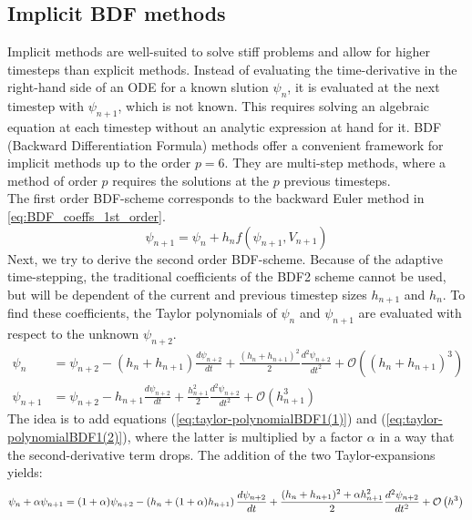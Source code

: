 \subsection{Implicit BDF methods}
Implicit methods are well-suited to solve stiff problems and allow for higher timesteps than explicit methods. Instead of evaluating the time-derivative in the right-hand side of an ODE for a known slution $\psi_n$, it is evaluated at the next timestep with $\psi_{n+1}$, which is not known. This requires solving an algebraic equation at each timestep without an analytic expression at hand for it. BDF (Backward Differentiation Formula) methods offer a convenient framework for implicit methods up to the order $p=6$. They are multi-step methods, where a method of order $p$ requires the solutions at the $p$ previous timesteps.  \\
The first order BDF-scheme corresponds to the backward Euler method in \autoref{eq:BDF_coeffs_1st_order}.
\begin{equation}
    \label{eq:BDF_coeffs_1st_order}
    \psi_{n+1} = \psi_n + h_{n}f(\psi_{n+1},V_{n+1})
\end{equation}
Next, we try to derive the second order BDF-scheme. Because of the adaptive time-stepping, the traditional coefficients of the BDF2 scheme cannot be used, but will be dependent of the current and previous timestep sizes $h_{n+1}$ and $h_n$. To find these coefficients, the Taylor polynomials of $\psi_n$ and $\psi_{n+1}$ are evaluated with respect to the unknown $\psi_{n+2}$. 
\begin{align}
    \label{eq:taylor-polynomialBDF1(1)}
    \psi_{n} &= \psi_{n+2} - (h_{n} + h_{n+1})\frac{d\psi_{n+2}}{dt} + \frac{(h_{n} + h_{n+1})^2}{2}\frac{d^2\psi_{n+2}}{dt^2} + \mathcal{O}\left((h_{n} + h_{n+1})^3\right) \\
    \label{eq:taylor-polynomialBDF1(2)}
    \psi_{n+1} &= \psi_{n+2} - h_{n+1}\frac{d\psi_{n+2}}{dt} + \frac{h_{n+1}^2}{2}\frac{d^2\psi_{n+2}}{dt^2} + \mathcal{O}\left(h_{n+1}^3\right)
\end{align}
The idea is to add equations (\ref{eq:taylor-polynomialBDF1(1)}) and (\ref{eq:taylor-polynomialBDF1(2)}), where the latter is multiplied by a factor $\alpha$ in a way that the second-derivative term drops. The addition of the two Taylor-expansions yields: 
\begin{equation}
	\psi_{n} + \alpha \psi_{n+1} = (1+\alpha)\psi_{n+2} - \left(h_{n} + (1+\alpha)h_{n+1}\right)\frac{d\psi_{n+2}}{dt} + \frac{(h_{n} + h_{n+1})^2+\alpha h_{n+1}^2}{2}\frac{d^2\psi_{n+2}}{dt^2} + \mathcal{O}\left(h^3\right) \\
\end{equation}
